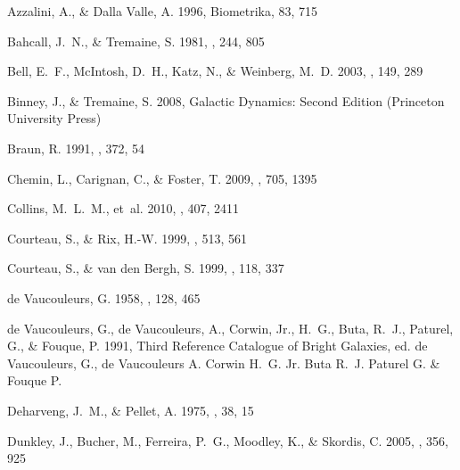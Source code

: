 \documentclass[preprint,12pt]{aastex}
\begin{document}
\begin{thebibliography}{}

{Azzalini}, A., \& {Dalla Valle}, A. 1996, Biometrika, 83, 715

{Bahcall}, J.~N., \& {Tremaine}, S. 1981, \apj, 244, 805

{Bell}, E.~F., {McIntosh}, D.~H., {Katz}, N., \& {Weinberg}, M.~D. 2003, \apjs,
  149, 289

{Binney}, J., \& {Tremaine}, S. 2008, {Galactic Dynamics: Second Edition}
  (Princeton University Press)

{Braun}, R. 1991, \apj, 372, 54

{Chemin}, L., {Carignan}, C., \& {Foster}, T. 2009, \apj, 705, 1395

{Collins}, M.~L.~M., {et~al.} 2010, \mnras, 407, 2411

{Courteau}, S., \& {Rix}, H.-W. 1999, \apj, 513, 561

{Courteau}, S., \& {van den Bergh}, S. 1999, \aj, 118, 337

{de Vaucouleurs}, G. 1958, \apj, 128, 465

{de Vaucouleurs}, G., {de Vaucouleurs}, A., {Corwin}, Jr., H.~G., {Buta},
  R.~J., {Paturel}, G., \& {Fouque}, P. 1991, {Third Reference Catalogue of
  Bright Galaxies}, ed. {de Vaucouleurs, G., de Vaucouleurs A. Corwin H.~G. Jr.
  Buta R.~J. Paturel G. \& Fouque P.}

{Deharveng}, J.~M., \& {Pellet}, A. 1975, \aap, 38, 15

{Dunkley}, J., {Bucher}, M., {Ferreira}, P.~G., {Moodley}, K., \& {Skordis}, C.
  2005, \mnras, 356, 925


\end{thebibliography}
\end{document}
